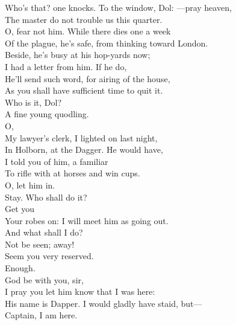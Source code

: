\documentclass[a4paper,oneside,12pt]{memoir}
\begin{document}
\begin{drama*}
\subtlespeaks Who's that? one knocks. To the window, Dol: ---pray heaven,\\
The master do not trouble us this quarter.\\
\facespeaks  O, fear not him. While there dies one a week\\
Of the plague, he's safe, from thinking toward London.\\
Beside, he's busy at his hop-yards now;\\
I had a letter from him. If he do,\\
He'll send such word, for airing of the house,\\
As you shall have sufficient time to quit it.\\
\subtlespeaks Who is it, Dol?\\
\dolspeaks {} A fine young quodling.\\
\facespeaks {} O,\\
My lawyer's clerk, I lighted on last night,\\
In Holborn, at the Dagger. He would have,\\
I told you of him, a familiar\\
To rifle with at horses and win cups.\\
\dolspeaks O, let him in.\\
\subtlespeaks {} Stay. Who shall do it?\\
\facespeaks {}  Get you\\
Your robes on: I will meet him as going out.\\
\dolspeaks And what shall I do?\\
\facespeaks {} Not be seen; away!\\
Seem you very reserved.\\
\subtlespeaks {} Enough.\\
\facespeaks {}  God be with you, sir,\\
I pray you let him know that I was here:\\
His name is Dapper. I would gladly have staid, but---\\
\dapperspeaks {} Captain, I am here.\\

\end{drama*}
\end{document}
